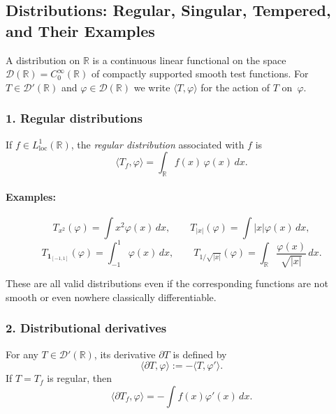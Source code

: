 \documentclass[12pt,a4paper]{article}
\theoremstyle{plain}
\theoremstyle{definition}
\theoremstyle{remark}
\theoremstyle{remark}
\begin{document}

\subsection*{Distributions: Regular, Singular, Tempered, and Their Examples}

A distribution on $\mathbb{R}$ is a continuous linear functional on the
space $\mathcal{D}(\mathbb{R})=C_0^\infty(\mathbb{R})$ of compactly
supported smooth test functions. For $T\in\mathcal{D}'(\mathbb{R})$ and
$\varphi\in\mathcal{D}(\mathbb{R})$ we write $\langle T,\varphi\rangle$
for the action of $T$ on~$\varphi$.

\subsubsection*{1. Regular distributions}

If $f\in L^1_{\mathrm{loc}}(\mathbb{R})$, the \emph{regular distribution}
associated with $f$ is
\[
\boxed{
	\langle T_f,\varphi\rangle = \int_{\mathbb{R}} f(x)\,\varphi(x)\,dx
}.
\]

\paragraph{Examples:}
\[
T_{x^2}(\varphi)=\int x^2\varphi(x)\,dx,\qquad
T_{|x|}(\varphi)=\int |x|\varphi(x)\,dx,
\]
\[
T_{\mathbf{1}_{[-1,1]}}(\varphi)=\int_{-1}^1\varphi(x)\,dx,\qquad
T_{1/\sqrt{|x|}}(\varphi)=
\int_{\mathbb{R}} \frac{\varphi(x)}{\sqrt{|x|}}\,dx.
\]

These are all valid distributions even if the corresponding functions
are not smooth or even nowhere classically differentiable.

\subsubsection*{2. Distributional derivatives}

For any $T\in\mathcal{D}'(\mathbb{R})$, its derivative $\partial T$ is
defined by
\[
\boxed{
	\langle \partial T,\varphi\rangle := -\langle T,\varphi'\rangle.
}
\]
If $T=T_f$ is regular, then
\[
\langle \partial T_f,\varphi\rangle
= -\int f(x)\varphi'(x)\,dx.
\]
\end{document}

